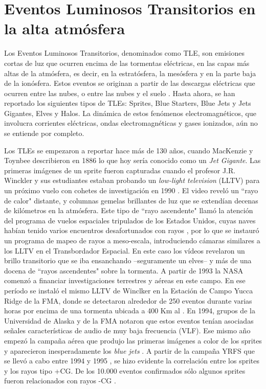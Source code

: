 \documentclass[12pt,oneside,openany,letter]{book}
\begin{document}

\chapter{Eventos Luminosos Transitorios en la alta atmósfera}\label{TLEs}
Los Eventos Luminosos Transitorios, denominados como TLE, son emisiones cortas de luz que ocurren encima de las tormentas eléctricas, en las capas más altas de la atmósfera, es decir, en la estratósfera, la mesósfera y en la parte baja de la ionósfera. Estos eventos se originan a partir de las descargas eléctricas que ocurren entre las nubes, o entre las nubes y el suelo \cite{DwyerUman2014}. Hasta ahora, se han reportado los siguientes tipos de TLEs: Sprites, Blue Starters, Blue Jets y Jets Gigantes, Elves y Halos. La dinámica de estos fenómenos electromagnéticos, que involucra corrientes eléctricas, ondas electromagnéticas y gases ionizados, aún no se entiende por completo.

Los TLEs se empezaron a reportar hace más de 130 años, cuando MacKenzie y Toynbee describieron en 1886 \cite{FullekrugEtal2006} lo que hoy sería conocido como un \textit{Jet Gigante}. Las primeras imágenes de un sprite fueron capturadas cuando el profesor J.R. Winckler y sus estudiantes estaban probando un \textit{low-light television} (LLTV) para un próximo vuelo con cohetes de investigación en 1990 \cite{FranzEtal1990}. El video reveló un ``rayo de calor" distante, y columnas gemelas brillantes de luz que se extendían decenas de kilómetros en la atmósfera. Este tipo de ``rayo ascendente" llamó la atención del programa de vuelos espaciales tripulados de los Estados Unidos, cuyas naves habían tenido varios encuentros desafortunados con rayos \cite{UmanRakov2003}, por lo que se instauró un programa de mapeo de rayos a meso-escala, introduciendo cámaras similares a los LLTV en el Transbordador Espacial. En este caso los vídeos revelaron un brillo transitorio que se iba ensanchando --seguramente un elves-- y más de una docena de ``rayos ascendentes" sobre la tormenta. A partir de 1993 la NASA comenzó a financiar investigaciones terrestres y aéreas en este campo. En ese período se instaló el mismo LLTV de Winclker en la Estación de Campo Yucca Ridge de la FMA, donde se detectaron alrededor de 250 eventos durante varias horas por encima de una tormenta ubicada a 400 Km al  \cite{Lyons1994A, Lyons1994B}. En 1994, grupos de la Universidad de Alaska y de la FMA notaron que estos eventos tenían asociadas señales características de audio de muy baja frecuencia (VLF). Ese mismo año empezó la campaña aérea que produjo las primeras imágenes a color de los sprites y aparecieron inesperadamente los \textit{blue jets} \cite{SentmanEtal1995}. A partir de la campaña YRFS que se llevó a cabo entre 1994 y 1995 \cite{Lyons1996B}, se hizo evidente la correlación entre los sprites y los rayos tipo +CG. De los 10.000 eventos confirmados sólo algunos sprites fueron relacionados con rayos -CG \cite{BarringtonEtal1999}. 
\end{document}

